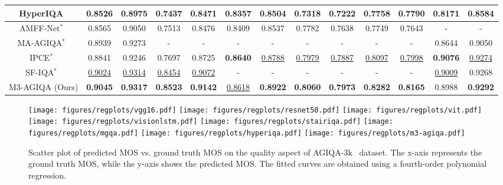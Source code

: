 \begin{table*}
\begin{tabular}{c|c c|c c| c c|c c|c c| c c}
        HyperIQA~\cite{Su_2020_CVPR} & 0.8526 & 0.8975 & 0.7437 & 0.8471 & 0.8357 & 0.8504 & 0.7318 & 0.7222 & 0.7758 & 0.7790 & 0.8171 & 0.8584  \\
        \midrule
        AMFF-Net$^\ast$~\cite{zhou2024adaptive} & 0.8565 & 0.9050 & 0.7513 & 0.8476 & 0.8409 & 0.8537 & 0.7782 & 0.7638 & 0.7749 & 0.7643 & - & - \\
        MA-AGIQA$^\ast$~\cite{wang2024large} & 0.8939 & 0.9273 & - & - & - & - & - & - & - & -& 0.8644 & 0.9050 \\
        IPCE$^\ast$~\cite{peng2024aigc} & 0.8841 & 0.9246 & 0.7697 & 0.8725 & \textbf{0.8640} & \underline{0.8788} & \underline{0.7979} & \underline{0.7887} & \underline{0.8097} & \underline{0.7998} & \textbf{0.9076} & \underline{0.9274} \\
        SF-IQA$^\ast$~\cite{yu2024sf} & \underline{0.9024} & \underline{0.9314} & \underline{0.8454} & \underline{0.9072} & - & - & - & - & - & - & \underline{0.9009} & 0.9268  \\
        \midrule
        M3-AGIQA (Ours) & \textbf{0.9045} & \textbf{0.9317} & \textbf{0.8523} & \textbf{0.9142} & \underline{0.8618} & \textbf{0.8922} & 
        \textbf{0.8060} & \textbf{0.7973} & \textbf{0.8282} & \textbf{0.8165} & 0.8988 & \textbf{0.9292} \\
        \bottomrule
    \end{tabular}
\end{table*}


\begin{figure*}
    \centering
    \texttt{[image: figures/regplots/vgg16.pdf]}
    \texttt{[image: figures/regplots/resnet50.pdf]}
    \texttt{[image: figures/regplots/vit.pdf]}
    \texttt{[image: figures/regplots/visionlstm.pdf]}
    \texttt{[image: figures/regplots/stairiqa.pdf]}
    \texttt{[image: figures/regplots/mgqa.pdf]}
    \texttt{[image: figures/regplots/hyperiqa.pdf]}
    \texttt{[image: figures/regplots/m3-agiqa.pdf]}
    
    \caption{Scatter plot of predicted MOS vs. ground truth MOS on the quality aspect of AGIQA-3k~\cite{li2023agiqa} dataset. The x-axis represents the ground truth MOS, while the y-axis shows the predicted MOS. The fitted curves are obtained using a fourth-order polynomial regression.}
    \label{fig:scatter}
\end{figure*}

